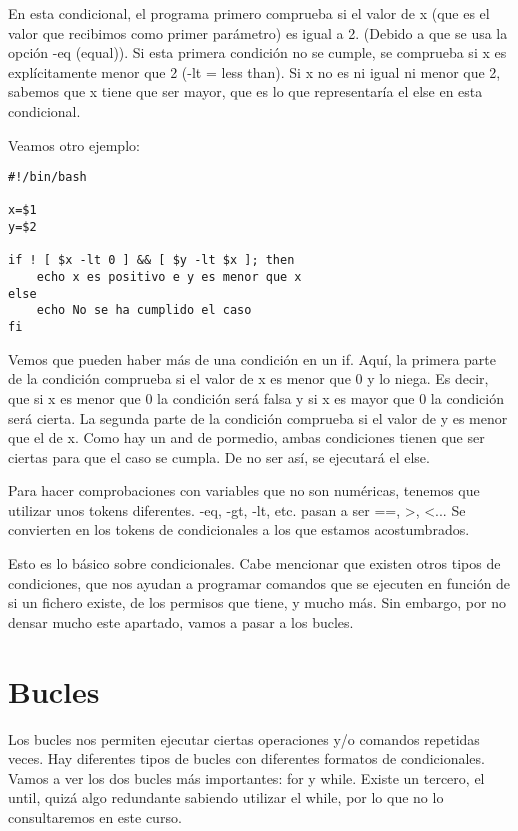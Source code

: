 En esta condicional, el programa primero comprueba si el valor de x (que es el valor que recibimos como primer parámetro) es igual a 2. (Debido a que se usa la opción -eq (equal)). Si esta primera condición no se cumple, se comprueba si x es explícitamente menor que 2 (-lt = less than). Si x no es ni igual ni menor que 2, sabemos que x tiene que ser mayor, que es lo que representaría el else en esta condicional.

Veamos otro ejemplo:

\begin{tcolorbox-code}
\begin{lstlisting}
#!/bin/bash

x=$1
y=$2

if ! [ $x -lt 0 ] && [ $y -lt $x ]; then
	echo x es positivo e y es menor que x
else
	echo No se ha cumplido el caso
fi
\end{lstlisting}
\end{tcolorbox-code}

Vemos que pueden haber más de una condición en un if. Aquí, la primera parte de la condición comprueba si el valor de x es menor que 0 y lo niega. Es decir, que si x es menor que 0 la condición será falsa y si x es mayor que 0 la condición será cierta. La segunda parte de la condición comprueba si el valor de y es menor que el de x. Como hay un and de pormedio, ambas condiciones tienen que ser ciertas para que el caso se cumpla. De no ser así, se ejecutará el else.

Para hacer comprobaciones con variables que no son numéricas, tenemos que utilizar unos tokens diferentes. -eq, -gt, -lt, etc. pasan a ser ==, >, <... Se convierten en los tokens de condicionales a los que estamos acostumbrados.


Esto es lo básico sobre condicionales. Cabe mencionar que existen otros tipos de condiciones, que nos ayudan a programar comandos que se ejecuten en función de si un fichero existe, de los permisos que tiene, y mucho más. Sin embargo, por no densar mucho este apartado, vamos a pasar a los bucles.

\section{Bucles}
Los bucles nos permiten ejecutar ciertas operaciones y/o comandos repetidas veces. Hay diferentes tipos de bucles con diferentes formatos de condicionales. Vamos a ver los dos bucles más importantes: for y while. Existe un tercero, el until, quizá algo redundante sabiendo utilizar el while, por lo que no lo consultaremos en este curso.

